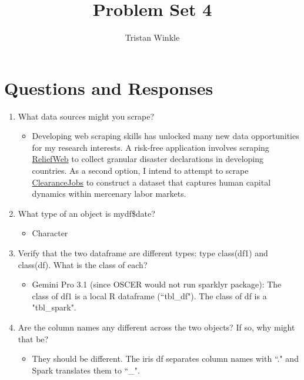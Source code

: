 \documentclass[12pt]{article}
\title{Problem Set 4}
\author{Tristan Winkle}
\date{}
\begin{document}
\maketitle

\section{Questions and Responses}

\begin{enumerate} 
	\item What data sources might you scrape?
        \begin{itemize}
            \item[-] Developing web scraping skills has unlocked many new data opportunities for my research interests. A risk-free application involves scraping \href{https://reliefweb.int/}{ReliefWeb} to collect granular disaster declarations in developing countries. As a second option, I intend to attempt to scrape \href{https://www.clearancejobs.com/}{ClearanceJobs} to construct a dataset that captures human capital dynamics within mercenary labor markets.
        \end{itemize}

    \item[5(d).] What type of an object is mydf\$date?
        \begin{itemize}
            \item[-] Character
        \end{itemize}

    \item[6.7.] Verify that the two dataframe are different types: type class(df1) and class(df). What is the class of each? 
        \begin{itemize}
            \item[-] Gemini Pro 3.1 (since OSCER would not run sparklyr package):  The class of df1 is a local R dataframe (``tbl\_df"). The class of df is a "tbl\_spark".
        \end{itemize}

    \item[6.8.] Are the column names any different across the two objects? If so, why might that be?
        \begin{itemize}
            \item[-] They should be different. The iris df separates column names with ``." and Spark translates them to ``\_". 
        \end{itemize}
\end{enumerate}

\end{document}
